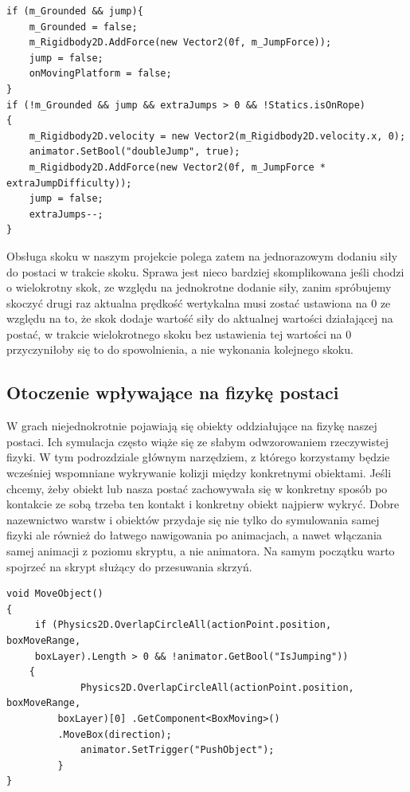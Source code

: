 \documentclass[oneside,polski,logo]{amuthesis}
\begin{document}
\begin{lstlisting}[breaklines=true,
language={[Sharp]C},
rulecolor=\color{blue!80!black},
caption={Fragment klasy \texttt{CharacterController.cs}}
]
if (m_Grounded && jump){
	m_Grounded = false;
	m_Rigidbody2D.AddForce(new Vector2(0f, m_JumpForce));
	jump = false;
	onMovingPlatform = false;
}
if (!m_Grounded && jump && extraJumps > 0 && !Statics.isOnRope)
{
	m_Rigidbody2D.velocity = new Vector2(m_Rigidbody2D.velocity.x, 0);
	animator.SetBool("doubleJump", true);
	m_Rigidbody2D.AddForce(new Vector2(0f, m_JumpForce * extraJumpDifficulty));
	jump = false;
	extraJumps--;
}
\end{lstlisting}

Obsługa skoku w naszym projekcie polega zatem na jednorazowym dodaniu siły do postaci w trakcie skoku. Sprawa jest nieco bardziej skomplikowana jeśli chodzi o wielokrotny skok, ze względu na jednokrotne dodanie siły, zanim spróbujemy skoczyć drugi raz aktualna prędkość wertykalna musi zostać ustawiona na 0 ze względu na to, że skok dodaje wartość siły do aktualnej wartości działającej na postać, w trakcie wielokrotnego skoku bez ustawienia tej wartości na 0 przyczyniłoby się to do spowolnienia, a nie wykonania kolejnego skoku.
\subsection{Otoczenie wpływające na fizykę postaci}
W grach niejednokrotnie pojawiają się obiekty oddziałujące na fizykę naszej postaci. Ich symulacja często wiąże się ze słabym odwzorowaniem rzeczywistej fizyki. W tym podrozdziale głównym narzędziem, z którego korzystamy będzie wcześniej wspomniane wykrywanie kolizji między konkretnymi obiektami. Jeśli chcemy, żeby obiekt lub nasza postać zachowywała się w konkretny sposób po kontakcie ze sobą trzeba ten kontakt i konkretny obiekt najpierw wykryć. Dobre nazewnictwo warstw i obiektów przydaje się nie tylko do symulowania samej fizyki ale również do łatwego nawigowania po animacjach, a nawet włączania samej animacji z poziomu skryptu, a nie animatora. Na samym początku warto spojrzeć na skrypt służący do przesuwania skrzyń.

\begin{lstlisting}[breaklines=true,
language={[Sharp]C},
rulecolor=\color{blue!80!black},
caption={Fragment klasy \texttt{PlayerMovement.cs}}
]
void MoveObject()
{
	 if (Physics2D.OverlapCircleAll(actionPoint.position, boxMoveRange, 
	 boxLayer).Length > 0 && !animator.GetBool("IsJumping"))
	{
           	 Physics2D.OverlapCircleAll(actionPoint.position, boxMoveRange,
		 boxLayer)[0] .GetComponent<BoxMoving>()
		 .MoveBox(direction);
           	 animator.SetTrigger("PushObject");
      	 }
}
\end{lstlisting}
\end{document}

